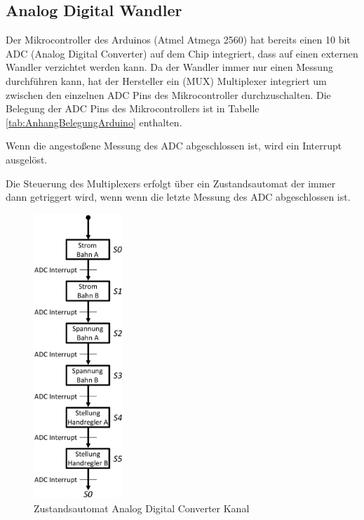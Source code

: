 \documentclass[a4paper, 11pt]{report}
\begin{document}
	\subsection{Analog Digital Wandler}\label{subsec:ADC}

		Der Mikrocontroller des Arduinos (Atmel Atmega 2560) hat bereits einen 10 bit ADC (Analog Digital Converter) auf dem Chip integriert, dass auf einen externen Wandler verzichtet werden kann.
		Da der Wandler immer nur einen Messung durchführen kann, hat der Hersteller ein (MUX) Multiplexer integriert um zwischen den einzelnen ADC Pins des Mikrocontroller durchzuschalten.
		Die Belegung der ADC Pins des Mikrocontrollers ist in Tabelle \ref{tab:AnhangBelegungArduino} enthalten.

		Wenn die angestoßene Messung des ADC abgeschlossen ist, wird ein Interrupt ausgelöst.


		Die Steuerung des Multiplexers erfolgt über ein Zustandsautomat der immer dann getriggert wird, wenn wenn die letzte Messung des ADC abgeschlossen ist.

		\begin{figure}[ht]
			\centering
			\includegraphics[width=0.3\textwidth]{rec/ADCAutomat.png}
			\caption{Zustandsautomat Analog Digital Converter Kanal}
			\label{img:ADCMUX}
		\end{figure}
\end{document}
